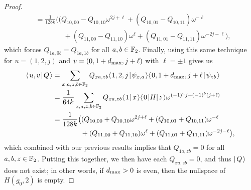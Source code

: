 \documentclass[../thesis-main/thesis-main]{subfiles}
\begin{document}
\begin{proof}
\begin{align}
  &= \frac{1}{128 k} \big( (Q_{10,00} - Q_{10,10} \omega^{2j + \ell} + (Q_{10,01} - Q_{10,11})\omega^{-\ell} \nonumber\\
  &\qquad \qquad + (Q_{11,00} - Q_{11,10})\omega^{\ell} + (Q_{11,01} - Q_{11,11})\omega^{-2j - \ell}\big),
\end{align}
which forces $Q_{1a,0b} = Q_{1a,1b}$ for all $a,b\in \mathbb{F}_2$.  Finally, using this same technique for $u = (1,2,j)$ and $v = (0,1+d_{\text{max}}, j+\ell)$ with $\ell = \pm 1$ gives us
\begin{align}
  \langle\mspace{2mu} u,v \mspace{2mu} | \mspace{2mu} Q\mspace{2mu} \rangle &= \sum_{x,a,z,b\in \mathbb{F}_2} Q_{xa,zb} \langle\mspace{2mu} 1,2,j \mspace{2mu} | \mspace{2mu} \psi_{x,a}\mspace{2mu} \rangle\langle\mspace{2mu} 0,1+d_{\text{max}},j+\ell \mspace{2mu} | \mspace{2mu} \psi_{zb}\mspace{2mu} \rangle\\
  &=\frac{1}{64 k} \sum_{x,a,z,b\in \mathbb{F}_2} Q_{xa,zb} \langle\mspace{2mu} 1 \mspace{2mu} | \mspace{2mu} x\mspace{2mu} \rangle \langle\mspace{2mu} 0 \mspace{2mu} | H |\mspace{2mu} z \mspace{2mu} \rangle \omega^{(-1)^a j+ (-1)^b (j+\ell)}\\
  &= \frac{1}{128 k} \big( (Q_{10,00} + Q_{10,10} \omega^{2j + \ell} + (Q_{10,01} + Q_{10,11})\omega^{-\ell} \nonumber\\
  &\qquad \qquad + (Q_{11,00} + Q_{11,10})\omega^{\ell} + (Q_{11,01} + Q_{11,11})\omega^{-2j - \ell}\big),
\end{align}
which combined with our previous results implies that $Q_{1a,zb} = 0$ for all $a,b,z\in\mathbb{F}_2$.  Putting this together, we then have each $Q_{xa,zb} = 0$, and thus $|\mspace{2mu} Q \mspace{2mu} \rangle$ does not exist; in other words, if $d_{\text{max}} >0$ is even, then the nullspace of $H(g_0,2)$ is empty.


\end{proof}
\end{document}
